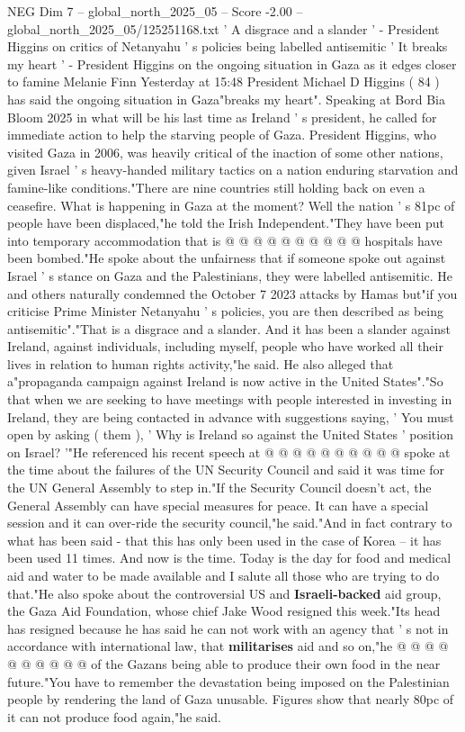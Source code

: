 \begin{textsample}{NEG Dim 7 – global\_north\_2025\_05 – Score -2.00 – global\_north\_2025\_05/125251168.txt}  \label{ex:f7_neg_120}
' A disgrace and a slander ' - President Higgins on critics of Netanyahu ' s policies being labelled antisemitic ' It breaks my heart ' - President Higgins on the ongoing situation in Gaza as it edges closer to famine Melanie Finn Yesterday at 15:48 President Michael D Higgins ( 84 ) has said the ongoing situation in Gaza"breaks my heart".
Speaking at Bord Bia Bloom 2025 in what will be his last time as Ireland ' s president, he called for immediate action to help the starving people of Gaza.
President Higgins, who visited Gaza in 2006, was heavily critical of the inaction of some other nations, given Israel ' s heavy-handed military tactics on a nation enduring starvation and famine-like conditions."There are nine countries still holding back on even a ceasefire.
What is happening in Gaza at the moment?
Well the nation ' s 81pc of people have been displaced,"he told the Irish Independent."They have been put into temporary accommodation that is @ @ @ @ @ @ @ @ @ @ hospitals have been bombed."He spoke about the unfairness that if someone spoke out against Israel ' s stance on Gaza and the Palestinians, they were labelled antisemitic.
He and others naturally condemned the October 7 2023 attacks by Hamas but"if you criticise Prime Minister Netanyahu ' s policies, you are then described as being antisemitic"."That is a disgrace and a slander.
And it has been a slander against Ireland, against individuals, including myself, people who have worked all their lives in relation to human rights activity,"he said.
He also alleged that a"propaganda campaign against Ireland is now active in the United States"."So that when we are seeking to have meetings with people interested in investing in Ireland, they are being contacted in advance with suggestions saying, ' You must open by asking ( them ), ' Why is Ireland so against the United States ' position on Israel? '"He referenced his recent speech at @ @ @ @ @ @ @ @ @ @ spoke at the time about the failures of the UN Security Council and said it was time for the UN General Assembly to step in."If the Security Council doesn't act, the General Assembly can have special measures for peace.
It can have a special session and it can over-ride the security council,"he said."And in fact contrary to what has been said - that this has only been used in the case of Korea -- it has been used 11 times.
And now is the time.
Today is the day for food and medical aid and water to be made available and I salute all those who are trying to do that."He also spoke about the controversial US and \textbf{Israeli-backed} aid group, the Gaza Aid Foundation, whose chief Jake Wood resigned this week."Its head has resigned because he has said he can not work with an agency that ' s not in accordance with international law, that \textbf{militarises} aid and so on,"he @ @ @ @ @ @ @ @ @ @ of the Gazans being able to produce their own food in the near future."You have to remember the devastation being imposed on the Palestinian people by rendering the land of Gaza unusable.
Figures show that nearly 80pc of it can not produce food again,"he said.

\end{textsample}
